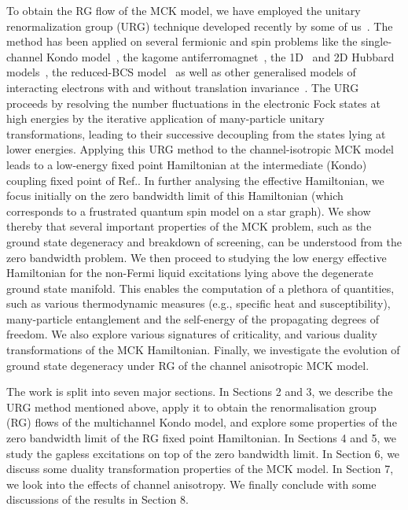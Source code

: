 \documentclass{iopart}
\begin{document}
To obtain the RG flow of the MCK model, we have employed the unitary renormalization group (URG) technique developed recently by  some of us~\cite{anirbanurg1,anirbanurg2}. The method has been applied on several fermionic and spin problems like the single-channel Kondo model~\cite{kondo_urg}, the kagome antiferromagnet~\cite{santanukagome}, the 1D~\cite{1dhubjhep} and 2D Hubbard models~\cite{anirbanmott1,anirbanmott2,mukherjeeMERG2022}, the reduced-BCS model~\cite{siddharthacpi} as well as other generalised models of interacting electrons with and without translation invariance~\cite{anirbanurg2}.
The URG proceeds by resolving the number fluctuations in the electronic Fock states at high energies by the iterative application of many-particle unitary transformations, leading to their successive decoupling from the states lying at lower energies. Applying this URG method to the channel-isotropic MCK model leads to a low-energy fixed point Hamiltonian at the intermediate (Kondo) coupling fixed point of Ref.\cite{Noz_blandin_1980}. In further analysing the effective Hamiltonian, we focus initially on the zero bandwidth limit of this Hamiltonian (which corresponds to a frustrated quantum spin model on a star graph). We show thereby that several important properties of the MCK problem, such as the ground state degeneracy and breakdown of screening, can be understood from the zero bandwidth problem.
We then proceed to studying the low energy effective Hamiltonian for the non-Fermi liquid excitations lying above the degenerate ground state manifold. This enables the computation of a plethora of quantities, such as various thermodynamic measures (e.g., specific heat and susceptibility), many-particle entanglement and the self-energy of the propagating degrees of freedom. We also explore various signatures of criticality, and various duality transformations of the MCK Hamiltonian. Finally, we investigate the evolution of ground state degeneracy under RG of the channel anisotropic MCK model.

The work is split into seven major sections. In Sections 2 and 3, we describe the URG method mentioned above, apply it to obtain the renormalisation group (RG) flows of the multichannel Kondo model, and explore some properties of the zero bandwidth limit of the RG fixed point Hamiltonian. In Sections 4 and 5, we study the gapless excitations on top of the zero bandwidth limit. In Section 6, we discuss some duality transformation properties of the MCK model. In Section 7, we look into the effects of channel anisotropy. We finally conclude with some discussions of the results in Section 8.
\end{document}
